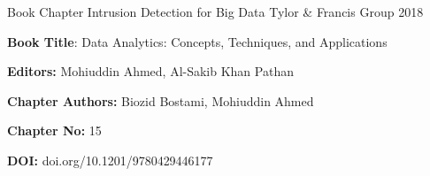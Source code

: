 

\begin{cventries}

  \cventry
    {Book Chapter} %
    {Intrusion Detection for Big Data} %
    {Tylor \& Francis Group} %
    {2018} %
    {	\begin{cvitems} %
    		\item {\textbf{Book Title}: Data Analytics: Concepts, Techniques, and Applications }
    		\item {\textbf{Editors:} Mohiuddin Ahmed, Al-Sakib Khan Pathan }
    		\item {\textbf{Chapter Authors:} Biozid Bostami, Mohiuddin Ahmed }
    		\item {\textbf{Chapter No:} 15 }
    		\item {\textbf{DOI:} doi.org/10.1201/9780429446177 }
    	\end{cvitems}
    }

 
\end{cventries}
